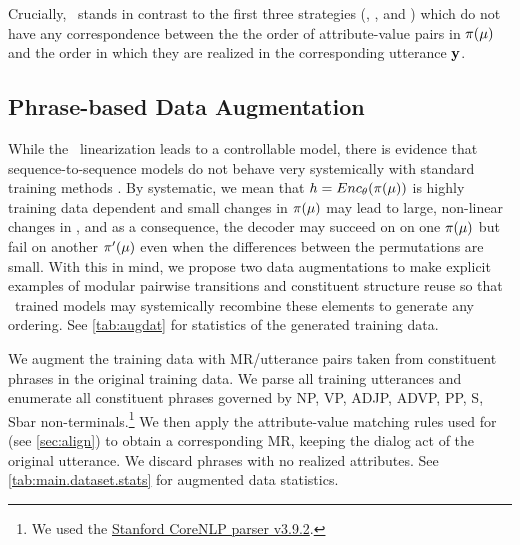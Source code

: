 Crucially, \alignmenttraining~stands in contrast to the  first three strategies
(, , and ) which do not have any
correspondence between the the order of attribute-value pairs in $\pi(\mu)$
and the order in which they are realized in the corresponding
utterance $\mathbf{y}$.





\subsection{Phrase-based Data Augmentation}
While the \alignshort~linearization leads to a controllable model,
there is evidence that sequence-to-sequence models do not behave very
systemically with standard training methods 
\cite{lake2018generalization,loula2018rearranging}. By systematic, we mean that
$h = Enc_\theta(\pi(\mu))$ is highly training data dependent and 
 small changes in $\pi(\mu)$ may lead to large, non-linear
changes in \rep, and as a consequence, the decoder may succeed on
on one $\pi(\mu)$ but fail on another $\pi^\prime(\mu)$ even when the 
differences between the permutations are small. With this in mind, we propose
two data augmentations to make explicit examples of  modular pairwise 
transitions and constituent structure reuse so that \alignshort~trained models
may systemically recombine these elements to generate any ordering.
See \autoref{tab:augdat} for statistics of the generated training data.


We augment the training data with MR/utterance pairs taken from constituent
phrases in the original training data. 
We parse all training utterances and enumerate all constituent phrases
governed by 
NP, VP, ADJP, ADVP, PP, S, Sbar
non-terminals.\footnote{We used the \href{https://stanfordnlp.github.io/CoreNLP/}{Stanford CoreNLP parser v3.9.2}.} We then apply the attribute-value 
matching rules
used for  (see \autoref{sec:align})
to obtain a corresponding MR, keeping the dialog act 
of the original utterance. We discard
phrases with no realized attributes.
See \autoref{tab:main.dataset.stats} for augmented data statistics.

